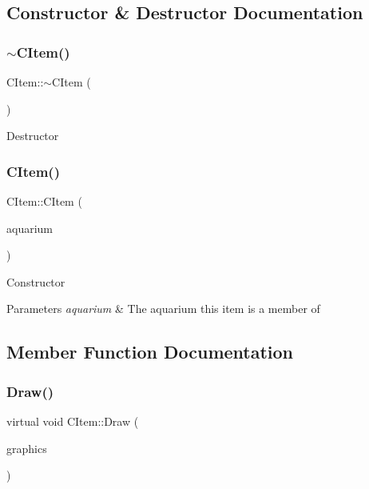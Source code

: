 \subsection{Constructor \& Destructor Documentation}
\mbox{\label{class_c_item_a2487c6e822ed0e850544f1745b43f584}} 
\subsubsection{\texorpdfstring{$\sim$CItem()}{~CItem()}}
{\footnotesize\ttfamily C\+Item\+::$\sim$\+C\+Item (\begin{DoxyParamCaption}{ }\end{DoxyParamCaption})\hspace{0.3cm}{\ttfamily [virtual]}}

Destructor \mbox{\label{class_c_item_a665b3fa4628b43e69b1d7f2b9529882b}} 
\subsubsection{\texorpdfstring{CItem()}{CItem()}}
{\footnotesize\ttfamily C\+Item\+::\+C\+Item (\begin{DoxyParamCaption}\item[{\mbox{\hyperlink{class_c_aquarium}{C\+Aquarium}} $\ast$}]{aquarium }\end{DoxyParamCaption})\hspace{0.3cm}{\ttfamily [protected]}}

Constructor 
\begin{DoxyParams}{Parameters}
{\em aquarium} & The aquarium this item is a member of \\
\hline
\end{DoxyParams}


\subsection{Member Function Documentation}
\mbox{\label{class_c_item_a7ef8448d0c4bc53d0f1943a4dc817f6f}} 
\subsubsection{\texorpdfstring{Draw()}{Draw()}}
{\footnotesize\ttfamily virtual void C\+Item\+::\+Draw (\begin{DoxyParamCaption}\item[{Gdiplus\+::\+Graphics $\ast$}]{graphics }\end{DoxyParamCaption})\hspace{0.3cm}{\ttfamily [pure virtual]}}

